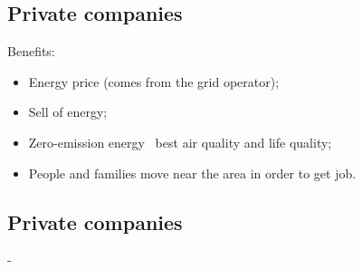 \documentclass{article}
\newcommand{\tra}{\textrightarrow\ }
\begin{document}
\subsection{Private companies}
Benefits:
\begin{itemize}
    \item Energy price (comes from the grid operator);
    \item Sell of energy;
    \item Zero-emission energy \tra best air quality and life quality;
    \item People and families move near the area in order to get job.
\end{itemize}

\subsection{Private companies}
-

\newpage
\end{document}
